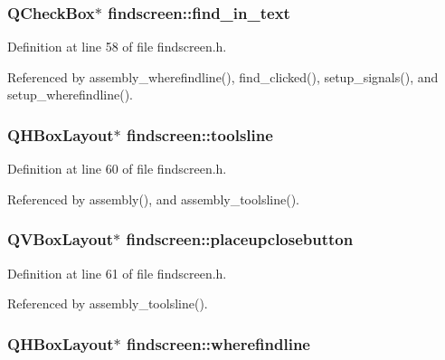 \subsubsection{\setlength{\rightskip}{0pt plus 5cm}QCheck\-Box$\ast$ {\bf findscreen::find\_\-in\_\-text}\hspace{0.3cm}{\tt  [private]}}\label{classfindscreen_39e9062c690996843f63688123d3bb3e}




Definition at line 58 of file findscreen.h.

Referenced by assembly\_\-wherefindline(), find\_\-clicked(), setup\_\-signals(), and setup\_\-wherefindline().
\subsubsection{\setlength{\rightskip}{0pt plus 5cm}QHBox\-Layout$\ast$ {\bf findscreen::toolsline}\hspace{0.3cm}{\tt  [private]}}\label{classfindscreen_fa5c4d3189d40d76b66bd7cc027d0aa0}




Definition at line 60 of file findscreen.h.

Referenced by assembly(), and assembly\_\-toolsline().
\subsubsection{\setlength{\rightskip}{0pt plus 5cm}QVBox\-Layout$\ast$ {\bf findscreen::placeupclosebutton}\hspace{0.3cm}{\tt  [private]}}\label{classfindscreen_7036a96e3ee8e35c3fc1e50923f28e68}




Definition at line 61 of file findscreen.h.

Referenced by assembly\_\-toolsline().
\subsubsection{\setlength{\rightskip}{0pt plus 5cm}QHBox\-Layout$\ast$ {\bf findscreen::wherefindline}\hspace{0.3cm}{\tt  [private]}}\label{classfindscreen_25386ff1d160154580941a0cba4d9e8f}




